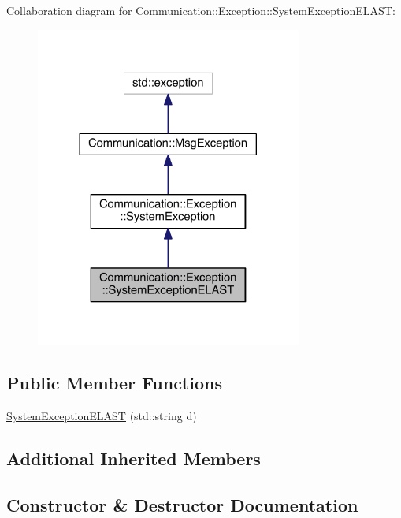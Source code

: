 Collaboration diagram for Communication\+:\+:Exception\+:\+:System\+Exception\+E\+L\+A\+S\+T\+:\nopagebreak
\begin{figure}[H]
\begin{center}
\leavevmode
\includegraphics[width=248pt]{class_communication_1_1_exception_1_1_system_exception_e_l_a_s_t__coll__graph}
\end{center}
\end{figure}
\subsection*{Public Member Functions}
\begin{DoxyCompactItemize}
\item 
\hyperlink{class_communication_1_1_exception_1_1_system_exception_e_l_a_s_t_a5241cfb3cb0fa79109a40c3a7126ca68}{System\+Exception\+E\+L\+A\+S\+T} (std\+::string d)
\end{DoxyCompactItemize}
\subsection*{Additional Inherited Members}


\subsection{Constructor \& Destructor Documentation}
\hypertarget{class_communication_1_1_exception_1_1_system_exception_e_l_a_s_t_a5241cfb3cb0fa79109a40c3a7126ca68}{}
